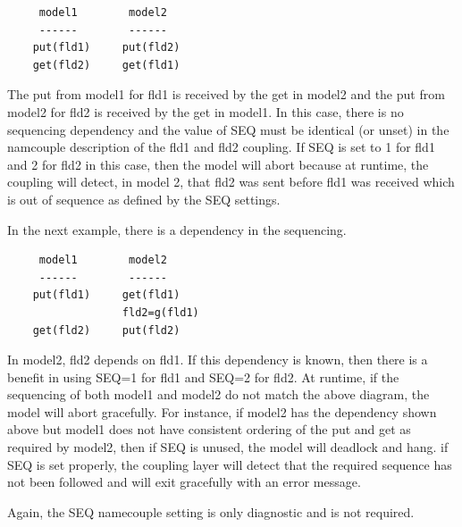 \begin{verbatim}
     model1        model2
     ------        ------
    put(fld1)     put(fld2)
    get(fld2)     get(fld1)
\end{verbatim}

The put from model1 for fld1 is received by the get in model2 and the
put from model2 for fld2 is received by the get in model1.  In this case,
there is no sequencing dependency and the value of SEQ must be
identical (or unset) in the namcouple description of the fld1
and fld2 coupling.  If SEQ is set to 1 for fld1 and 2 for fld2 in this case, then
the model will abort because at runtime, the coupling will detect, in model 2, that 
fld2 was sent before fld1 was received which is out of sequence
as defined by the SEQ settings.

In the next example, there is a dependency in the sequencing.

\begin{verbatim}
     model1        model2
     ------        ------
    put(fld1)     get(fld1)
                  fld2=g(fld1)
    get(fld2)     put(fld2)
\end{verbatim}

In model2, fld2 depends on fld1.  If this dependency is known, then
there is a benefit in using SEQ=1 for fld1 and SEQ=2 for fld2.  At
runtime, if the sequencing of both model1 and model2 do not match
the above diagram, the model will abort gracefully.  For instance,
if model2 has the dependency shown above but model1 does not have
consistent ordering of the put and get as required by model2,
then if SEQ is unused, the model will deadlock and hang.  if SEQ
is set properly, the coupling layer will detect that the required
sequence has not been followed and will exit gracefully with an
error message.  

Again, the SEQ namecouple setting is only diagnostic and is
not required.

